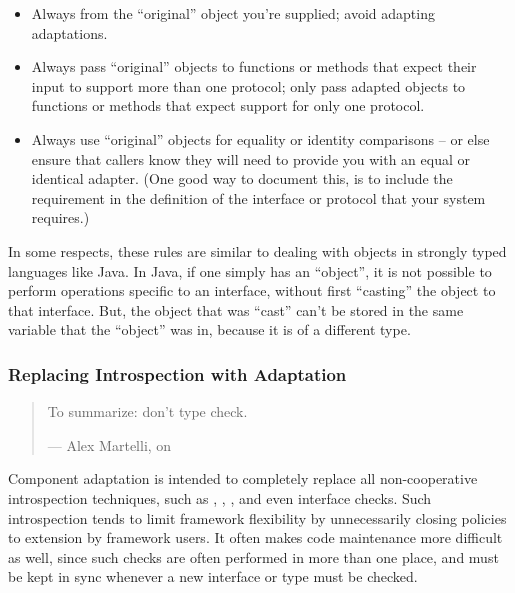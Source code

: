 \begin{verbatim%
}
\begin{verbatim%
}
\begin{itemize}

\item Always  from the ``original'' object you're supplied;
avoid adapting adaptations.

\item Always pass ``original'' objects to functions or methods that expect
their input to support more than one protocol; only pass adapted objects to
functions or methods that expect support for only one protocol.

\item Always use ``original'' objects for equality or identity comparisons --
or else ensure that callers know they will need to provide you with an equal or
identical adapter.  (One good way to document this, is to include the
requirement in the definition of the interface or protocol that your system
requires.)

\end{itemize}

In some respects, these rules are similar to dealing with objects in strongly
typed languages like Java.  In Java, if one simply has an ``object'', it is not
possible to perform operations specific to an interface, without first
``casting'' the object to that interface.  But, the object that was ``cast''
can't be stored in the same variable that the ``object'' was in, because it
is of a different type.

















\newpage
\subsubsection{Replacing Introspection with Adaptation\label{replintrowadapt}}

\begin{quotation}
To summarize: don't type check.

\hfill --- Alex Martelli, on 
\end{quotation}

Component adaptation is intended to completely replace all non-cooperative
introspection techniques, such as , ,
, and even interface checks.  Such introspection
tends to limit framework flexibility by unnecessarily closing policies to
extension by framework users.  It often makes code maintenance more difficult
as well, since such checks are often performed in more than one place, and
must be kept in sync whenever a new interface or type must be checked.


\end{verbatim%
}
\end{verbatim%
}
